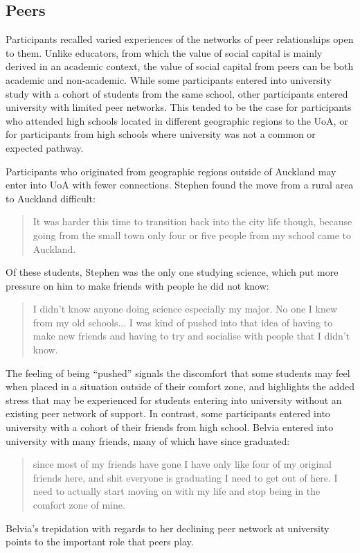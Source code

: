 \subsection{Peers}
Participants recalled varied experiences of the networks of peer relationships open to them. Unlike educators, from which the value of social capital is mainly derived in an academic context, the value of social capital from peers can be both academic and non-academic. While some participants entered into university study with a cohort of students from the same school, other participants entered university with limited peer networks. This tended to be the case for participants who attended high schools located in different geographic regions to the UoA, or for participants from high schools where university was not a common or expected pathway. 

Participants who originated from geographic regions outside of Auckland may enter into UoA with fewer connections. Stephen found the move from a rural area to Auckland difficult: \blockquote{It was harder this time to transition back into the city life though, because going from the small town only four or five people from my school came to Auckland.} Of these students, Stephen was the only one studying science, which put more pressure on him to make friends with people he did not know: \blockquote{I didn't know anyone doing science especially my major. No one I knew from my old schools... I was kind of pushed into that idea of having to make new friends and having to try and socialise with people that I didn't know.} The feeling of being ``pushed'' signals the discomfort that some students may feel when placed in a situation outside of their comfort zone, and highlights the added stress that may be experienced for students entering into university without an existing peer network of support. In contrast, some participants entered into university with a cohort of their friends from high school. Belvia entered into university with many friends, many of which have since graduated: \blockquote{since most of my friends have gone I have only like four of my original friends here, and shit everyone is graduating I need to get out of here. I need to actually start moving on with my life and stop being in the comfort zone of mine.} Belvia's trepidation with regards to her declining peer network at university points to the important role that peers play. 

